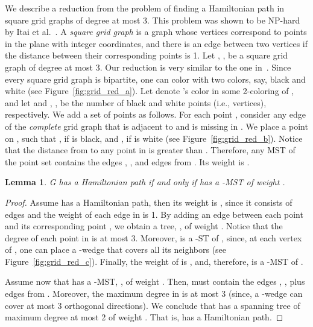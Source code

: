 \documentclass[11pt]{article}
\newtheorem{lemma}[theorem]{Lemma}
\begin{document}
{We describe a reduction from the problem of finding a Hamiltonian path in square grid graphs of degree at most 3. This problem was shown to be NP-hard by Itai et al.~\cite{IPS82}.
A {\em square grid graph} is a graph whose vertices correspond to points in the plane with integer coordinates, and there is an edge between two vertices if the distance between their corresponding points is 1. 
Let , , be a square grid graph of degree at most 3. Our reduction is very similar to the one in~\cite{PV84}. Since every square grid graph is bipartite, one can color  with two colors, say, black and white (see Figure~\ref{fig:grid_red_a}). Let  denote 's color in some 2-coloring of , and let  and , , be the number of black and white points (i.e., vertices), respectively. 
We add a set  of  points as follows. For each point , consider any edge  of the {\em complete} grid graph that is adjacent to  and is missing in . We place a point  on , such that , if  is black, and , if  is white (see Figure~\ref{fig:grid_red_b}). Notice that the distance from  to any point in  is greater than . 
Therefore, any MST of the point set  contains the  edges , , and  edges from . Its weight is .


\begin{lemma}
\label{lem:hardness1}
G has a Hamiltonian path if and only if  has a -MST of weight . 
\end{lemma}
\begin{proof}
Assume  has a Hamiltonian path, then its weight is , since it consists of  edges and the weight of each edge in  is 1.
By adding an edge between each point  and its corresponding point , we obtain a tree, , of weight . Notice that the degree of each point in  is at most 3. Moreover,  is a -ST of , since, at each vertex of , one can place a -wedge that covers all its neighbors (see Figure~\ref{fig:grid_red_c}). Finally, the weight of  is , and, therefore,  is a -MST of .

Assume now that  has a -MST, , of weight . Then,  must contain the  edges , , plus  edges from . Moreover, the maximum degree in  is at most 3 (since, a -wedge can cover at most 3 orthogonal directions). We conclude that  has a spanning tree of maximum degree at most 2 of weight . That is,  has a Hamiltonian path.
\end{proof}


\vspace{-3mm}
\subsection{}

}
\end{document}
